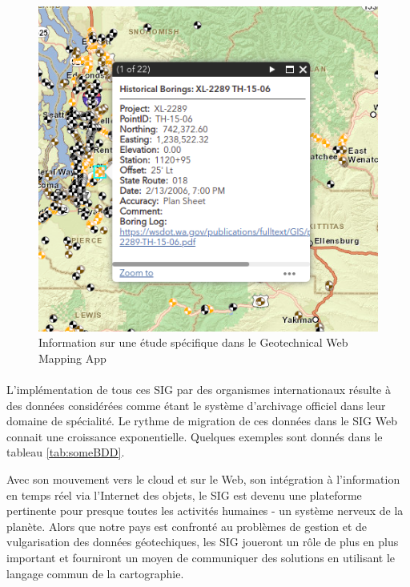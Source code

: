 \begin{figure}[t]
    \centering
    \includegraphics[width=1\textwidth]{images/Contexte/wash.png}
    \caption{Information sur une étude spécifique dans le Geotechnical Web Mapping App \cite{map1}}
    \label{fig:wash}
\end{figure}

\paragraph{}
L’implémentation de tous ces SIG par des organismes internationaux résulte à des données considérées 
comme étant le système d’archivage officiel dans leur domaine de spécialité.
Le rythme de migration de ces données dans le SIG Web connait une croissance exponentielle. 
Quelques exemples sont donnés dans le tableau \ref{tab:someBDD}.
\par
Avec son mouvement vers le cloud et sur le Web, son intégration à l'information 
en temps réel via l'Internet des objets, le SIG est devenu une plateforme 
pertinente pour presque toutes les activités humaines - un système nerveux de 
la planète. Alors que notre pays est confronté au problèmes de gestion et de vulgarisation 
des données géotechiques, les SIG joueront un rôle de plus 
en plus important et 
fourniront un moyen de communiquer des solutions en utilisant le langage commun de 
la cartographie.

